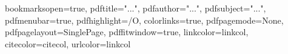\hypersetup
{
bookmarksopen=true,
pdftitle="...",
pdfauthor="...", 
pdfsubject="...", %
pdfmenubar=true, %
pdfhighlight=/O, %
colorlinks=true, %
pdfpagemode=None, %
pdfpagelayout=SinglePage, %
pdffitwindow=true, %
linkcolor=linkcol, %
citecolor=citecol, %
urlcolor=linkcol %
}


\setcounter{secnumdepth}{3}
\setcounter{tocdepth}{2}


\newcommand{\pd}[2]{\frac{\partial #1}{\partial #2}}
\def\abs{\operatorname{abs}}
\def\argmax{\operatornamewithlimits{arg\,max}}
\def\argmin{\operatornamewithlimits{arg\,min}}
\def\diag{\operatorname{Diag}}
\newcommand{\eqRef}[1]{(\ref{#1})}

\usepackage{rotating}                    %
\usepackage{fancyhdr}                    %

  

\pagestyle{fancy}                       %
\fancyfoot{}                            %



\fancyhead[LE,RO]{}
\fancyhead[RE]{\bfseries\nouppercase{\leftmark}}      %
\fancyhead[LO]{\bfseries\nouppercase{\rightmark}}     %

